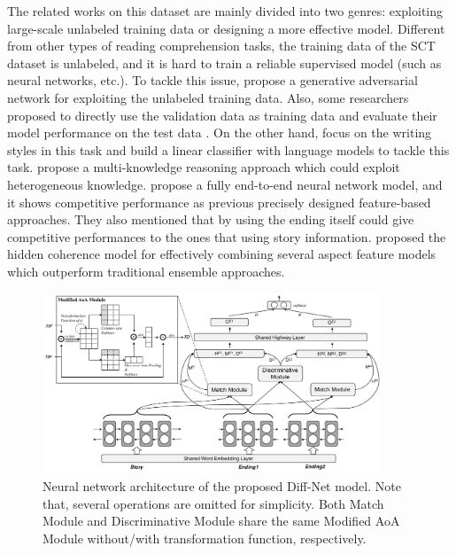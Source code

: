 \documentclass[letterpaper]{article} %
\begin{document}
The related works on this dataset are mainly divided into two genres: exploiting large-scale unlabeled training data or designing a more effective model.
Different from other types of reading comprehension tasks, the training data of the SCT dataset is unlabeled, and it is hard to train a reliable supervised model (such as neural networks, etc.).
To tackle this issue, \citeauthor{bingning-etal-2017}  propose a generative adversarial network for exploiting the unlabeled training data.
Also, some researchers proposed to directly use the validation data as training data and evaluate their model performance on the test data \cite{cai-etal-2017,chaturvedi-etal-2017}.
On the other hand, \citeauthor{schwartz-etal-2017}  focus on the writing styles in this task and build a linear classifier with language models to tackle this task.
\citeauthor{lin-etal-2017}  propose a multi-knowledge reasoning approach which could exploit heterogeneous knowledge.
\citeauthor{cai-etal-2017}  propose a fully end-to-end neural network model, and it shows competitive performance as previous precisely designed feature-based approaches. They also mentioned that by using the ending itself could give competitive performances to the ones that using story information.
\citeauthor{chaturvedi-etal-2017}  proposed the hidden coherence model for effectively combining several aspect feature models which outperform traditional ensemble approaches.

\begin{figure}[htbp]
\centering
\includegraphics[width=0.9\textwidth]{model.pdf}
\caption{\label{nn-arch} Neural network architecture of the proposed Diff-Net model. Note that, several operations are omitted for simplicity. Both Match Module and Discriminative Module share the same Modified AoA Module without/with transformation function, respectively.}
\end{figure}
\end{document}
